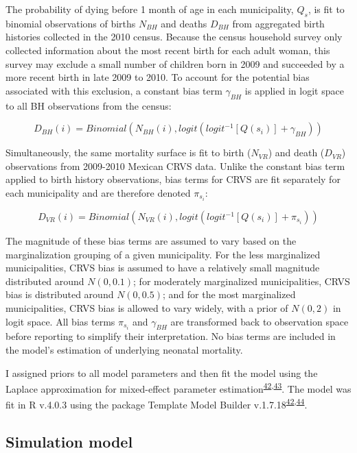 \documentclass[
]{article}
\begin{document}
The probability of dying before 1 month of age in each municipality, \(Q_s\), is fit to binomial observations of births \(N_{BH}\) and deaths \(D_{BH}\) from aggregated birth histories collected in the 2010 census. Because the census household survey only collected information about the most recent birth for each adult woman, this survey may exclude a small number of children born in 2009 and succeeded by a more recent birth in late 2009 to 2010. To account for the potential bias associated with this exclusion, a constant bias term \(\gamma_{BH}\) is applied in logit space to all BH observations from the census:

\[ D_{BH}(i) = Binomial(N_{BH}(i), logit( logit^{-1}[Q(s_i)] + \gamma_{BH}))\]

Simultaneously, the same mortality surface is fit to birth (\(N_{VR}\)) and death (\(D_{VR}\)) observations from 2009-2010 Mexican CRVS data. Unlike the constant bias term applied to birth history observations, bias terms for CRVS are fit separately for each municipality and are therefore denoted \(\pi_{s_i}\):

\[D_{VR}(i) = Binomial(N_{VR}(i), logit(logit^{-1}[Q(s_i)] + \pi_{s_i}))\]

The magnitude of these bias terms are assumed to vary based on the marginalization grouping of a given municipality. For the less marginalized municipalities, CRVS bias is assumed to have a relatively small magnitude distributed around \(N(0, 0.1)\); for moderately marginalized municipalities, CRVS bias is distributed around \(N(0, 0.5)\); and for the most marginalized municipalities, CRVS bias is allowed to vary widely, with a prior of \(N(0, 2)\) in logit space. All bias terms \(\pi_{s_i}\) and \(\gamma_{BH}\) are transformed back to observation space before reporting to simplify their interpretation. No bias terms are included in the model's estimation of underlying neonatal mortality.

I assigned priors to all model parameters and then fit the model using the Laplace approximation for mixed-effect parameter estimation\textsuperscript{\protect\hyperlink{ref-Kristensen2016}{42},\protect\hyperlink{ref-Thorson2016}{43}}⁠. The model was fit in R v.4.0.3 using the package Template Model Builder v.1.7.18\textsuperscript{\protect\hyperlink{ref-Kristensen2016}{42},\protect\hyperlink{ref-RCoreTeam2018}{44}}.

\hypertarget{simulation-model}{%
\subsection{Simulation model}\label{simulation-model}}
\end{document}
